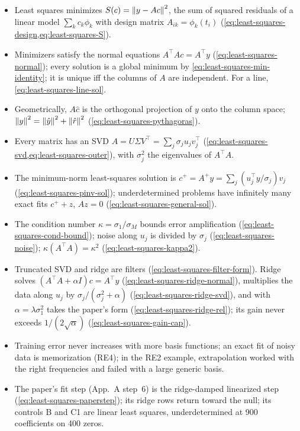 \begin{itemize}
\item Least squares minimizes $S(c) = \left\lVert y - Ac\right\rVert^2$, the sum of squared residuals of a linear model $\sum_k c_k\phi_k$ with design matrix $A_{ik}=\phi_k(t_i)$ (\cref{eq:least-squares-design,eq:least-squares-S}).
\item Minimizers satisfy the normal equations $A^\top Ac = A^\top y$ (\cref{eq:least-squares-normal}); every solution is a global minimum by \cref{eq:least-squares-min-identity}; it is unique iff the columns of $A$ are independent. For a line, \cref{eq:least-squares-line-sol}.
\item Geometrically, $A\hat c$ is the orthogonal projection of $y$ onto the column space; $\left\lVert y\right\rVert^2 = \left\lVert \hat y\right\rVert^2+\left\lVert \hat r\right\rVert^2$ (\cref{eq:least-squares-pythagoras}).
\item Every matrix has an SVD $A = U\Sigma V^\top = \sum_j\sigma_ju_jv_j^\top$ (\cref{eq:least-squares-svd,eq:least-squares-outer}), with $\sigma_j^2$ the eigenvalues of $A^\top A$.
\item The minimum-norm least-squares solution is $c^+ = A^+y = \sum_j(u_j^\top y/\sigma_j)v_j$ (\cref{eq:least-squares-pinv-sol}); underdetermined problems have infinitely many exact fits $c^++z$, $Az=0$ (\cref{eq:least-squares-general-sol}).
\item The condition number $\kappa=\sigma_1/\sigma_M$ bounds error amplification (\cref{eq:least-squares-cond-bound}); noise along $u_j$ is divided by $\sigma_j$ (\cref{eq:least-squares-noise}); $\kappa(A^\top A) = \kappa^2$ (\cref{eq:least-squares-kappa2}).
\item Truncated SVD and ridge are filters (\cref{eq:least-squares-filter-form}). Ridge solves $(A^\top A+\alpha I)c = A^\top y$ (\cref{eq:least-squares-ridge-normal}), multiplies the data along $u_j$ by $\sigma_j/(\sigma_j^2+\alpha)$ (\cref{eq:least-squares-ridge-svd}), and with $\alpha=\lambda\sigma_1^2$ takes the paper's form (\cref{eq:least-squares-ridge-rel}); its gain never exceeds $1/(2\sqrt\alpha)$ (\cref{eq:least-squares-gain-cap}).
\item Training error never increases with more basis functions; an exact fit of noisy data is memorization (RE4); in the RE2 example, extrapolation worked with the right frequencies and failed with a large generic basis.
\item The paper's fit step (App.~A step~6) is the ridge-damped linearized step (\cref{eq:least-squares-paperstep}); its ridge rows return toward the null; its controls B and C1 are linear least squares, underdetermined at 900 coefficients on 400 zeros.
\end{itemize}

